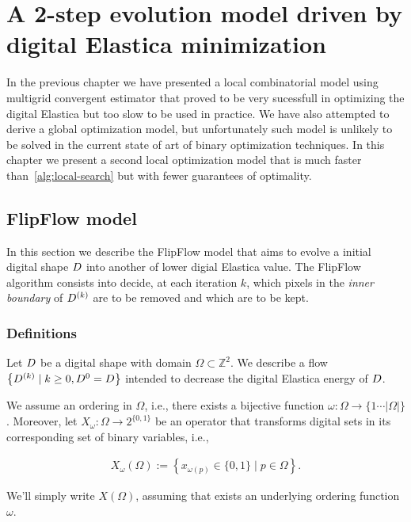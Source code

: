 \chapter{A 2-step evolution model driven by digital Elastica minimization}
\label{chapter:flip-flow}

In the previous chapter we have presented a local combinatorial model using multigrid convergent estimator that proved to be very sucessfull in optimizing the digital Elastica but too slow to be used in practice. We have also attempted to derive a global optimization model, but unfortunately such model is unlikely to be solved in the current state of art of binary optimization techniques. In this chapter we present a second local optimization model that is much faster than~\cref{alg:local-search} but with fewer guarantees of optimality.

\section{FlipFlow model}
\label{ch7:sec:flipflow-model}

In this section we describe the FlipFlow model that aims to evolve a initial digital shape $D$ into another of lower digial Elastica value. The FlipFlow algorithm consists into decide, at each iteration $k$, which pixels in the \emph{inner boundary} of $D^{(k)}$ are to be removed  and which are to be kept. 

\subsection{Definitions}
\label{ch7:subsec:definitions}

Let $D$ be a digital shape with domain $\Omega \subset \mathbb{Z}^2$. We describe a flow $\left \{ D^{(k)} \; | \; k \geq 0, D^{0} = D \right\}$ intended to decrease the digital Elastica energy of $D$.

We assume an ordering in $\Omega$, i.e., there exists a bijective function $\omega : \Omega \rightarrow \{1 \cdots |\Omega| \}$. Moreover, let $X_{\omega}:\Omega \rightarrow 2^{\{0,1\}}$ be an operator that transforms digital sets in its corresponding set of binary variables, i.e.,

\begin{align*}
	X_{\omega}(\Omega) := \left\{ x_{\omega(p)} \in \{0,1\} \; | \; p \in \Omega \right\}.
\end{align*}

We'll simply write $X(\Omega)$, assuming that exists an underlying ordering function $\omega$.

